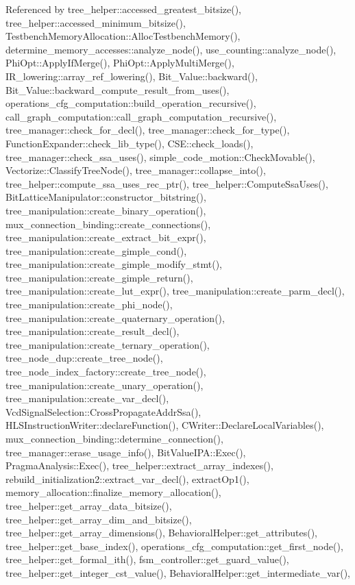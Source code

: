 Referenced by tree\+\_\+helper\+::accessed\+\_\+greatest\+\_\+bitsize(), tree\+\_\+helper\+::accessed\+\_\+minimum\+\_\+bitsize(), Testbench\+Memory\+Allocation\+::\+Alloc\+Testbench\+Memory(), determine\+\_\+memory\+\_\+accesses\+::analyze\+\_\+node(), use\+\_\+counting\+::analyze\+\_\+node(), Phi\+Opt\+::\+Apply\+If\+Merge(), Phi\+Opt\+::\+Apply\+Multi\+Merge(), I\+R\+\_\+lowering\+::array\+\_\+ref\+\_\+lowering(), Bit\+\_\+\+Value\+::backward(), Bit\+\_\+\+Value\+::backward\+\_\+compute\+\_\+result\+\_\+from\+\_\+uses(), operations\+\_\+cfg\+\_\+computation\+::build\+\_\+operation\+\_\+recursive(), call\+\_\+graph\+\_\+computation\+::call\+\_\+graph\+\_\+computation\+\_\+recursive(), tree\+\_\+manager\+::check\+\_\+for\+\_\+decl(), tree\+\_\+manager\+::check\+\_\+for\+\_\+type(), Function\+Expander\+::check\+\_\+lib\+\_\+type(), C\+S\+E\+::check\+\_\+loads(), tree\+\_\+manager\+::check\+\_\+ssa\+\_\+uses(), simple\+\_\+code\+\_\+motion\+::\+Check\+Movable(), Vectorize\+::\+Classify\+Tree\+Node(), tree\+\_\+manager\+::collapse\+\_\+into(), tree\+\_\+helper\+::compute\+\_\+ssa\+\_\+uses\+\_\+rec\+\_\+ptr(), tree\+\_\+helper\+::\+Compute\+Ssa\+Uses(), Bit\+Lattice\+Manipulator\+::constructor\+\_\+bitstring(), tree\+\_\+manipulation\+::create\+\_\+binary\+\_\+operation(), mux\+\_\+connection\+\_\+binding\+::create\+\_\+connections(), tree\+\_\+manipulation\+::create\+\_\+extract\+\_\+bit\+\_\+expr(), tree\+\_\+manipulation\+::create\+\_\+gimple\+\_\+cond(), tree\+\_\+manipulation\+::create\+\_\+gimple\+\_\+modify\+\_\+stmt(), tree\+\_\+manipulation\+::create\+\_\+gimple\+\_\+return(), tree\+\_\+manipulation\+::create\+\_\+lut\+\_\+expr(), tree\+\_\+manipulation\+::create\+\_\+parm\+\_\+decl(), tree\+\_\+manipulation\+::create\+\_\+phi\+\_\+node(), tree\+\_\+manipulation\+::create\+\_\+quaternary\+\_\+operation(), tree\+\_\+manipulation\+::create\+\_\+result\+\_\+decl(), tree\+\_\+manipulation\+::create\+\_\+ternary\+\_\+operation(), tree\+\_\+node\+\_\+dup\+::create\+\_\+tree\+\_\+node(), tree\+\_\+node\+\_\+index\+\_\+factory\+::create\+\_\+tree\+\_\+node(), tree\+\_\+manipulation\+::create\+\_\+unary\+\_\+operation(), tree\+\_\+manipulation\+::create\+\_\+var\+\_\+decl(), Vcd\+Signal\+Selection\+::\+Cross\+Propagate\+Addr\+Ssa(), H\+L\+S\+Instruction\+Writer\+::declare\+Function(), C\+Writer\+::\+Declare\+Local\+Variables(), mux\+\_\+connection\+\_\+binding\+::determine\+\_\+connection(), tree\+\_\+manager\+::erase\+\_\+usage\+\_\+info(), Bit\+Value\+I\+P\+A\+::\+Exec(), Pragma\+Analysis\+::\+Exec(), tree\+\_\+helper\+::extract\+\_\+array\+\_\+indexes(), rebuild\+\_\+initialization2\+::extract\+\_\+var\+\_\+decl(), extract\+Op1(), memory\+\_\+allocation\+::finalize\+\_\+memory\+\_\+allocation(), tree\+\_\+helper\+::get\+\_\+array\+\_\+data\+\_\+bitsize(), tree\+\_\+helper\+::get\+\_\+array\+\_\+dim\+\_\+and\+\_\+bitsize(), tree\+\_\+helper\+::get\+\_\+array\+\_\+dimensions(), Behavioral\+Helper\+::get\+\_\+attributes(), tree\+\_\+helper\+::get\+\_\+base\+\_\+index(), operations\+\_\+cfg\+\_\+computation\+::get\+\_\+first\+\_\+node(), tree\+\_\+helper\+::get\+\_\+formal\+\_\+ith(), fsm\+\_\+controller\+::get\+\_\+guard\+\_\+value(), tree\+\_\+helper\+::get\+\_\+integer\+\_\+cst\+\_\+value(), Behavioral\+Helper\+::get\+\_\+intermediate\+\_\+var(), 